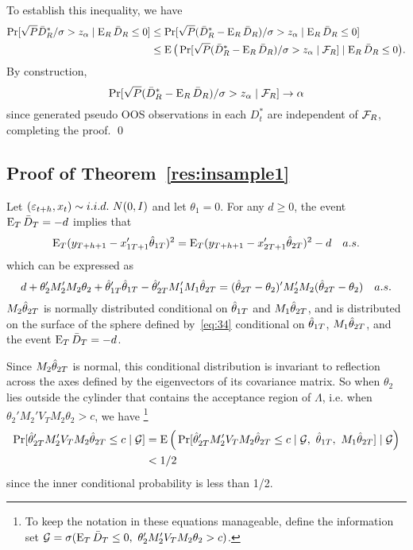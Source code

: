 \documentclass[12pt]{article}
\begin{document}
To establish this inequality, we have
\begin{align*}
  \Pr[\sqrt{P} \bar{D}_{R}^* / \sigma > z_\alpha \mid \operatorname{E}_R \bar{D}_{R} \leq 0]
  &\leq \Pr[\sqrt{P} (\bar{D}_{R}^* - \operatorname{E}_R \bar{D}_{R}) / \sigma > z_\alpha
  \mid \operatorname{E}_R \bar{D}_{R} \leq 0] \\
  &\leq \operatorname{E}\big(
  \Pr[\sqrt{P} (\bar{D}_{R}^* - \operatorname{E}_R \bar{D}_{R}) / \sigma > z_\alpha \mid \mathcal{F}_R]
  \mid \operatorname{E}_R \bar{D}_{R} \leq 0\big).
\end{align*}
By construction,
\begin{equation*}
  \Pr[\sqrt{P} (\bar{D}_{R}^* - \operatorname{E}_R \bar{D}_{R}) / \sigma > z_\alpha \mid \mathcal{F}_R]
  \to \alpha
\end{equation*}
since generated pseudo OOS observations in each $D_t^*$ are
independent of $\mathcal{F}_R$, completing the proof.
\qed

\subsection*{Proof of Theorem~\ref{res:insample1}}

Let $(\e_{t+h}, x_{t}) \sim i.i.d.\ N(0,I)$ and let $\theta_1 = 0$.
For any $d \geq 0$, the event $\operatorname{E}_T \bar{D}_{T} = -d$ implies that
\begin{equation*}
  \operatorname{E}_T (y_{T+h+1} - x_{1T+1}'\hat\theta_{1T})^2
  = \operatorname{E}_T (y_{T+h+1} - x_{2T+1}'\hat\theta_{2T})^2 - d \quad a.s.
\end{equation*}
which can be expressed as
\begin{equation}\label{eq:34}
  d + \theta_2'M_2' M_2 \theta_2 + \hat\theta_{1T}'\hat\theta_{1T} - \hat\theta_{2T}'M_1'M_1\hat\theta_{2T}
  = (\hat\theta_{2T} - \theta_2)' M_2'M_2 (\hat\theta_{2T} - \theta_2) \quad a.s.
\end{equation}
$M_2 \hat\theta_{2T}$ is normally distributed conditional on $\hat\theta_{1T}$ and
$M_1 \hat\theta_{2T}$, and is distributed on the surface of the sphere defined
by~\eqref{eq:34} conditional on $\hat\theta_{1T}$, $M_1 \hat\theta_{2T}$, and the
event $\operatorname{E}_T \bar{D}_{T} = -d$.

Since $M_2 \hat\theta_{2T}$ is normal, this conditional distribution is
invariant to reflection across the axes defined by the eigenvectors of
its covariance matrix. So when $\theta_2$ lies outside the cylinder
that contains the acceptance region of $\Lambda$, i.e. when
$\theta_2'M_2' V_T M_2 \theta_2 > c$, we have%
\footnote{To keep the notation in these equations manageable, define
  the information set $\mathcal{G} = \sigma(\operatorname{E}_T \bar{D}_{T} \leq 0,~ \theta_2'M_2'
  V_T M_2 \theta_2 > c)$.} %
\begin{align*}
  \Pr[ \hat\theta_{2T}' M_2' V_T M_2 \hat\theta_{2T} \leq c \mid \mathcal{G}]
  &= \operatorname{E}\Big( \Pr[ \hat\theta_{2T}'M_2' V_T M_2 \hat\theta_{2T} \leq c \mid \mathcal{G},~\hat\theta_{1T},~M_1 \hat\theta_{2T}] \mid \mathcal{G} \Big) \\
  & < 1/2
\end{align*}
since the inner conditional probability is less than 1/2.
\end{document}
